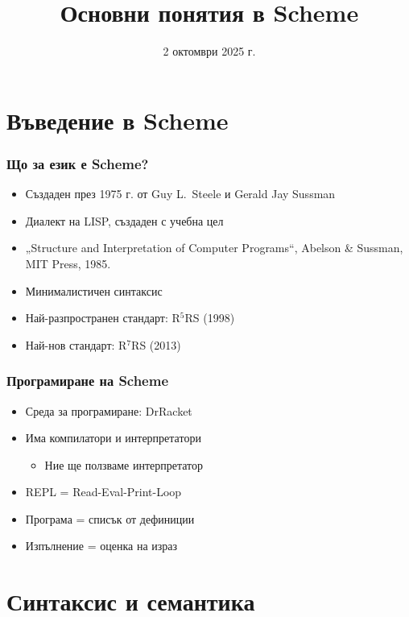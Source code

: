 \documentclass[alsotrans,beameroptions={aspectratio=169}]{beamerswitch}
\title{Основни понятия в Scheme}
\date{2 октомври 2025 г.}
\begin{document}
\begin{frame}
  \titlepage
\end{frame}

\section{Въведение в Scheme}

\begin{frame}
  \frametitle{Що за език е Scheme?}

  \begin{itemize}
  \item Създаден през 1975 г. от Guy L.~Steele и Gerald Jay Sussman
  \item Диалект на LISP, създаден с учебна цел
  \item „Structure and Interpretation of Computer Programs“, Abelson \& Sussman, MIT Press, 1985.
  \item Минималистичен синтаксис
  \item Най-разпространен стандарт: R$^5$RS (1998)
  \item Най-нов стандарт: R$^7$RS (2013)
  \end{itemize}
\end{frame}

\begin{frame}
  \frametitle{Програмиране на Scheme}

  \begin{itemize}
  \item Среда за програмиране: DrRacket
  \item Има компилатори и интерпретатори
    \begin{itemize}
    \item Ние ще ползваме интерпретатор
    \end{itemize}
  \item REPL = Read-Eval-Print-Loop
  \item Програма = списък от дефиниции
  \item Изпълнение = оценка на израз
  \end{itemize}
\end{frame}

\section{Синтаксис и семантика}
\end{document}
